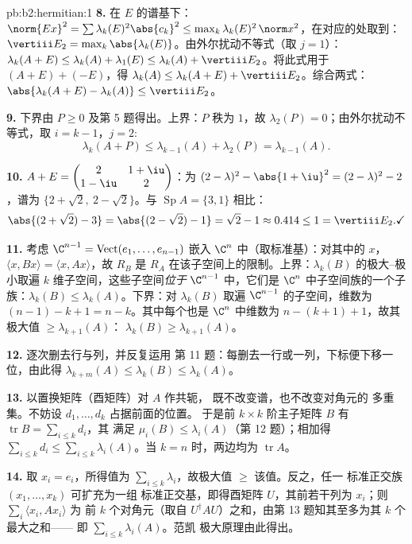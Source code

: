 \begin{solution}{pb:b2:hermitian:1}
\textbf{8.} 在 $E$ 的谱基下：$\norm{Ex}^2 = \sum
\lambda_k(E)^2\abs{c_k}^2 \leq \max_k\lambda_k(E)^2\,\norm
x^2$，在对应的处取到：$\vertiii E_2
= \max_k\abs{\lambda_k(E)}$。由外尔扰动不等式（取 $j = 1$）：$\lambda_k(A+E)
\leq \lambda_k(A) + \lambda_1(E) \leq \lambda_k(A) + \vertiii
E_2$。将此式用于 $(A+E) + (-E)$，得 $\lambda_k(A) \leq
\lambda_k(A+E) + \vertiii E_2$。综合两式：
$\abs{\lambda_k(A+E) - \lambda_k(A)} \leq \vertiii E_2$。

\textbf{9.} 下界由 $P \geq 0$ 及第 5 题得出。上界：$P$
秩为 $1$，故 $\lambda_2(P) = 0$；由外尔扰动不等式，取 $i = k-1$，$j =
2$:
\[
\lambda_k(A + P) \leq \lambda_{k-1}(A) + \lambda_2(P)
= \lambda_{k-1}(A) .
\]

\textbf{10.} $A + E = \begin{pmatrix} 2 & 1+\iu\\ 1-\iu &
2\end{pmatrix}$：为 $(2-\lambda)^2 -
\abs{1+\iu}^2 = (2-\lambda)^2 - 2$，谱为 $\{2 + \sqrt2,\ 2
- \sqrt2\}$。与 $\operatorname{Sp}A = \{3, 1\}$ 相比：
\[
\abs{(2+\sqrt2) - 3} = \abs{(2-\sqrt2) - 1} = \sqrt2 - 1
\approx 0.414 \leq 1 = \vertiii E_2 . \checkmark
\]

\textbf{11.} 考虑 $\C^{n-1} = \operatorname{Vect}(e_1, \dots,
e_{n-1})$ 嵌入 $\C^n$ 中（取标准基）：对其中的 $x$，
$\langle x, Bx\rangle = \langle x, Ax\rangle$，故 $R_B$ 是
$R_A$ 在该子空间上的限制。上界：$\lambda_k
(B)$ 的极大–极小取遍 $k$ 维子空间，这些子空间\emph{位于}
$\C^{n-1}$ 中，它们是 $\C^n$ 中子空间族的一个子族：$\lambda_k(B) \leq
\lambda_k(A)$。下界：对 $\lambda_k(B)$
取遍 $\C^{n-1}$ 的子空间，维数为 $(n-1)-k+1 =
n-k$。其中每个也是 $\C^n$ 中维数为 $n -
(k+1) + 1$，故其极大值 $\geq \lambda_{k+1}(A)$：
$\lambda_k(B) \geq \lambda_{k+1}(A)$。

\textbf{12.} 逐次删去行与列，并反复运用
第 11 题：每删去一行或一列，下标便下移一位，由此得
$\lambda_{k+m}(A) \leq \lambda_k(B) \leq \lambda_k(A)$。

\textbf{13.} 以置换矩阵（酉矩阵）对 $A$ 作共轭，
既不改变谱，也不改变对角元的
多重集。不妨设 $d_1, \dots, d_k$ 占据前面的位置。
于是前 $k\times k$ 阶主子矩阵 $B$ 有
$\operatorname{tr} B = \sum_{i\leq k}d_i$，其
满足 $\mu_i(B) \leq \lambda_i(A)$（第 12 题）；相加得
$\sum_{i\leq k}d_i \leq \sum_{i\leq k}\lambda_i(A)$。当 $k =
n$ 时，两边均为 $\operatorname{tr} A$。

\textbf{14.} 取 $x_i = e_i$，所得值为
$\sum_{i\leq k}\lambda_i$，故极大值 $\geq$ 该值。反之，任一
标准正交族 $(x_1, \dots, x_k)$ 可扩充为一组
标准正交基，即得酉矩阵 $U$，其前若干列为
$x_i$；则 $\sum_i\langle x_i, Ax_i\rangle$ 为
前 $k$ 个对角元（取自 $U^\dagger AU$）之和，由第
13 题知其至多为其 $k$ 个最大之和——
即 $\sum_{i\leq k}\lambda_i(A)$。范凯
极大原理由此得出。


\end{solution}

